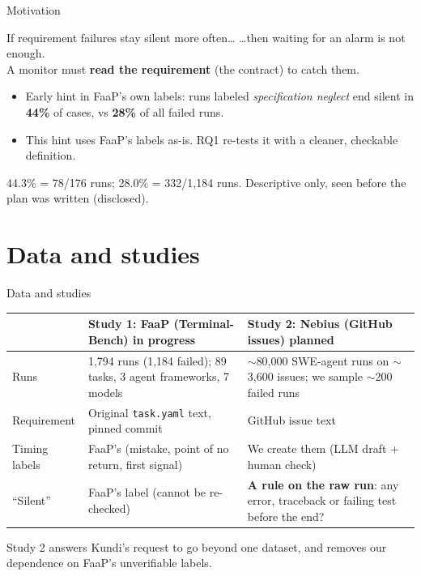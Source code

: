 \documentclass[aspectratio=169,11pt]{beamer}
\newcommand{\now}{{\small\color{accentAmber}\textbf{in progress}}}
\newcommand{\todo}{{\small\color{gray}\textbf{planned}}}
\newcommand{\fine}[1]{{\scriptsize\color{gray}#1}}
\begin{document}
\begin{frame}{Motivation}
  \begin{block}{If requirement failures stay silent more often\dots}
    \dots then waiting for an alarm is not enough.\\
    A monitor must \textbf{read the requirement} (the contract) to catch them.
  \end{block}
  \vspace{6pt}
  \begin{itemize}
    \item Early hint in FaaP's own labels: runs labeled \emph{specification neglect} end silent in
      \textbf{44\%} of cases, vs \textbf{28\%} of all failed runs.
    \item This hint uses FaaP's labels as-is. RQ1 re-tests it with a cleaner, checkable definition.
  \end{itemize}
  \vfill
  \fine{44.3\% = 78/176 runs; 28.0\% = 332/1,184 runs. Descriptive only, seen before the plan was written (disclosed).}
\end{frame}

\section{Data and studies}

\begin{frame}{Data and studies}
  \small
  \begin{tabularx}{\textwidth}{@{}lLL@{}}
    \toprule
      & \textbf{Study 1: FaaP (Terminal-Bench)} \hfill \now & \textbf{Study 2: Nebius (GitHub issues)} \hfill \todo \\
    \midrule
    Runs & 1,794 runs (1,184 failed); 89 tasks, 3 agent frameworks, 7 models & $\sim$80,000 SWE-agent runs on $\sim$3,600 issues; we sample $\sim$200 failed runs \\
    Requirement & Original \texttt{task.yaml} text, pinned commit & GitHub issue text \\
    Timing labels & FaaP's (mistake, point of no return, first signal) & We create them (LLM draft + human check) \\
    ``Silent'' & FaaP's label (cannot be re-checked) & \textbf{A rule on the raw run}: any error, traceback or failing test before the end? \\
    \bottomrule
  \end{tabularx}
  \vfill
  \fine{Study 2 answers Kundi's request to go beyond one dataset, and removes our dependence on FaaP's unverifiable labels.}
\end{frame}
\end{document}
